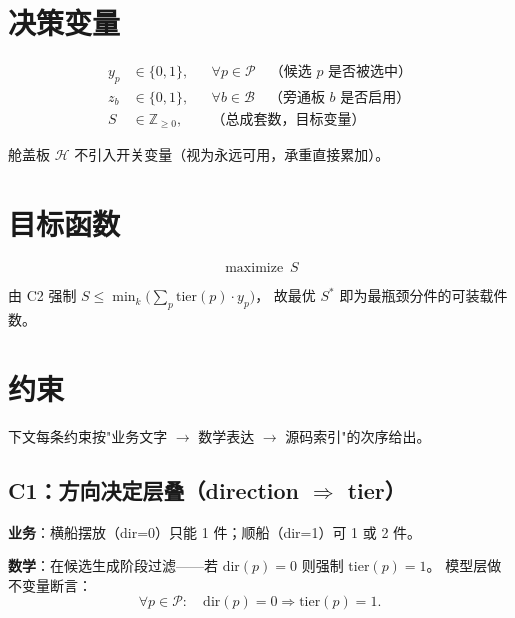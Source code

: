 \documentclass[a4paper,11pt]{ctexart}
\newcommand{\Z}{\mathbb{Z}}
\newcommand{\B}{\{0,1\}}
\newcommand{\set}[1]{\mathcal{#1}}
\DeclareMathOperator*{\maximize}{maximize}
\begin{document}
\section{决策变量}

\begin{align}
y_p   &\in \B,    && \forall p \in \set{P} \quad
   \text{（候选 $p$ 是否被选中）}\\
z_b   &\in \B,    && \forall b \in \set{B} \quad
   \text{（旁通板 $b$ 是否启用）}\\
S     &\in \Z_{\geq 0}, &&
   \text{（总成套数，目标变量）}
\end{align}

舱盖板 $\set{H}$ 不引入开关变量（视为永远可用，承重直接累加）。

\section{目标函数}

\begin{equation}
\boxed{\maximize\ S}
\end{equation}

由 C2 强制 $S \leq \min_k \big(\sum_p \text{tier}(p)\cdot y_p\big)$，
故最优 $S^*$ 即为最瓶颈分件的可装载件数。

\section{约束}\label{sec:constraints}

下文每条约束按"业务文字 $\to$ 数学表达 $\to$ 源码索引"的次序给出。

\subsection{C1：方向决定层叠（direction $\Rightarrow$ tier）}

\textbf{业务}：横船摆放（dir=0）只能 1 件；顺船（dir=1）可 1 或 2 件。

\textbf{数学}：在候选生成阶段过滤——若 $\text{dir}(p)=0$ 则强制 $\text{tier}(p)=1$。
模型层做不变量断言：
\[
\forall p\in\set{P}:\quad \text{dir}(p)=0 \Rightarrow \text{tier}(p)=1.
\]
\end{document}
